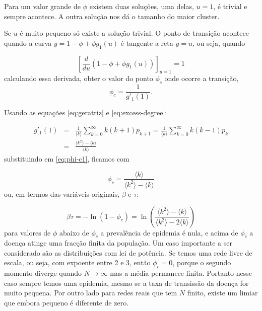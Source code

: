 \documentclass[a4paper,11pt]{report}
\begin{document}
Para um valor grande de $\phi$ existem duas solu\c{c}\~oes, uma delas, $u=1$, \'e trivial e sempre acontece. A outra solu\c{c}\~ao nos d\'a o tamanho do maior cluster. 

Se $u$ \'e muito pequeno s\'o existe a solu\c{c}\~ao trivial. O ponto de transi\c{c}\~ao acontece quando a curva $y=1-\phi+\phi g_1(u)$ \'e tangente a reta $y=u$, ou seja, quando


\begin{equation}
\left[\frac{d}{du}(1-\phi+\phi g_1(u))\right]_{u=1}=1
\end{equation}
calculando essa derivada, obter o valor do ponto $\phi_c$ onde ocorre a transi\c{c}\~ao,
\begin{equation}
\phi_c=\frac{1}{g'_1(1)}.
\label{eq:phi-c1}
\end{equation}

Usando as equa\c{c}\~oes \ref{eq:geratriz} e \ref{eq:excess-degree}:

\begin{eqnarray}
g'_1(1)&=&\frac{1}{\langle k\rangle}\sum_{k=0}^{\infty}k(k+1)p_{k+1}=\frac{1}{\langle k\rangle}\sum_{k=0}^{\infty}k(k-1)p_{k}\nonumber \\
\phantom{g'_1(1)}&=&\frac{\langle k^2\rangle-\langle k\rangle}{\langle k\rangle}
\end{eqnarray}
substituindo em \ref{eq:phi-c1}, ficamos com

\begin{equation}
\phi_c=\frac{\langle k\rangle}{\langle k^2\rangle-\langle k\rangle}
\label{eq:phi-c2}
\end{equation}
ou, em termos das vari\'aveis originais, $\beta$ e $\tau$:

\begin{equation}
\beta \tau=-\ln(1-\phi_c)=\ln\left(\frac{\langle k^2\rangle-\langle k\rangle}{\langle k^2\rangle-2\langle k\rangle}\right)
\label{eq:beta-tau}
\end{equation}
para valores de $\phi$ abaixo de $\phi_c$ a preval\^encia de epidemia \'e nula, e acima de $\phi_c$ a doen\c{c}a atinge uma frac\c{c}\~ao finita da popula\c{c}\~ao. Um caso importante a ser considerado s\~ao as distribui\c{c}\~oes com lei de pot\^encia. Se temos uma rede livre de escala, ou seja, com expoente entre 2 e 3, ent\~ao $\phi_c=0$, porque o segundo momento diverge quando $N\to\infty$ mas a m\'edia permanece finita. Portanto nesse caso sempre temos uma epidemia, mesmo se a taxa de transiss\~ao da doen\c{c}a for muito pequena. Por outro lado para redes reais que tem $N$ finito, existe um limiar que embora pequeno \'e diferente de zero.
\end{document}
